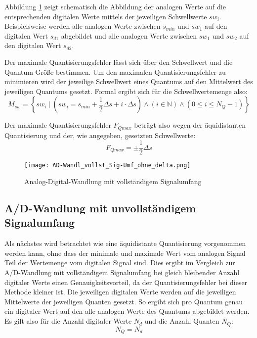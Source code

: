 Abbildung \ref{AD-Wandl_vollst_Sig-Umf_ohne_delta} zeigt schematisch die Abbildung der analogen Werte auf die entsprechenden digitalen Werte mittels der jeweiligen Schwellwerte $sw_i$. Beispielsweise werden alle analogen Werte zwischen $s_{min}$ und $sw_1$ auf den digitalen Wert $s_{d1}$ abgebildet und alle analogen Werte zwischen $sw_1$ und $sw_2$ auf den digitalen Wert $s_{d2}$.

Der maximale Quantisierungsfehler lässt sich über den Schwellwert und die Quantum-Größe bestimmen. Um den maximalen Quantisierungsfehler zu minimieren wird der jeweilige Schwellwert eines Quantums auf den Mittelwert des jeweiligen Quantums gesetzt. Formal ergibt sich für die Schwellwertemenge also:
\[ 
	M_{sw} =  \left\{ sw_i \mid 
	                           \left(sw_i = s_{min} 
	                           + \frac{1}{2} \Delta s + i \cdot \Delta s\right)
                               \wedge (i \in \mathbb{N})
	                           \wedge (0 \le i \le N_Q - 1)  \right\}
\]

Der maximale Quantisierungsfehler $F_{Qmax}$ beträgt also wegen der äquidistanten Quantisierung und der, wie angegeben, gesetzten Schwellwerte:
\[ 
	F_{Qmax} = \pm \frac{1}{2} \Delta s
\]

\begin{figure}[htbp] %
	\centering
	\texttt{[image: AD-Wandl\_vollst\_Sig-Umf\_ohne\_delta.png]}
	\caption{Analog-Digital-Wandlung mit vollständigem Signalumfang}
	\label{AD-Wandl_vollst_Sig-Umf_ohne_delta}
\end{figure}

\subsection{A/D-Wandlung mit unvollständigem Signalumfang}
Als nächstes wird betrachtet wie eine äquidistante Quantisierung vorgenommen werden kann, ohne dass der minimale und maximale Wert vom analogen Signal Teil der Wertemenge vom digitalen Signal sind. Dies ergibt im Vergleich zur A/D-Wandlung mit vollständigem Signalumfang bei gleich bleibender Anzahl digitaler Werte einen Genauigkeitsvorteil, da der Quantisierungsfehler bei dieser Methode kleiner ist.
Die jeweiligen digitalen Werte werden auf die jeweiligen Mittelwerte der jeweiligen Quanten gesetzt. So ergibt sich pro Quantum genau ein digitaler Wert auf den alle analogen Werte des Quantums abgebildet werden. Es gilt also für die Anzahl digitaler Werte $N_d$ und die Anzahl Quanten $N_Q$:
\[ 
	N_Q = N_d
\]

